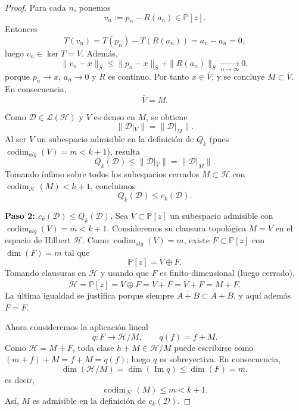 \documentclass[12pt,a4paper]{article}
\theoremstyle{definition}
\theoremstyle{remark}
\begin{document}
\begin{proof}
	Para cada $n$, ponemos
	\[
		v_n:=p_n-R(a_n)\in\mathbb P[z].
	\]
	Entonces
	\[
		T(v_n)=T(p_n)-T(R(a_n))=a_n-a_n=0,
	\]
	luego $v_n\in\ker T=V$. Además,
	\[
		\|v_n-x\|_S\le \|p_n-x\|_S+\|R(a_n)\|_S\xrightarrow[n\to\infty]{}0,
	\]
	porque $p_n\to x$, $a_n\to0$ y $R$ es continuo. Por tanto $x\in\overline V$, y se concluye $M\subset\overline V$. En consecuencia,
	\[
		\overline V=M.
	\]

	Como $\mathcal D\in\mathcal L(\mathcal H)$ y $V$ es denso en $M$, se obtiene
	\[
		\|\mathcal D|_V\|=\|\mathcal D|_M\|.
	\]
	Al ser $V$ un subespacio admisible en la definición de $Q_k$ (pues $\operatorname{codim}_{alg}(V)=m<k+1$), resulta
	\[
		Q_k(\mathcal D)\le \|\mathcal D|_V\|=\|\mathcal D|_M\|.
	\]
	Tomando ínfimo sobre todos los subespacios cerrados $M\subset\mathcal H$ con $\operatorname{codim}_{\mathcal H}(M)<k+1$, concluimos
	\[
		Q_k(\mathcal D)\le c_k(\mathcal D).
	\]

	\textbf{Paso 2: $c_k(\mathcal{D}) \le Q_k(\mathcal{D})$.}
	Sea $V \subset \mathbb{P}[z]$ un subespacio admisible con $\operatorname{codim}_{alg}(V) = m < k+1$. Consideremos su clausura topológica $M = \overline{V}$ en el espacio de Hilbert $\mathcal{H}$.
	Como $\operatorname{codim}_{alg}(V)=m$, existe $F\subset\mathbb{P}[z]$ con $\dim(F)=m$ tal que
	\[
		\mathbb{P}[z]=V\oplus F.
	\]
	Tomando clausuras en $\mathcal{H}$ y usando que $F$ es finito-dimensional (luego cerrado),
	\[
		\mathcal{H}=\overline{\mathbb{P}[z]}=\overline{V\oplus F}=\overline{V+F}=\overline V+F=M+F.
	\]
	La última igualdad se justifica porque siempre $\overline{A+B}\subset \overline A+\overline B$, y aquí además $\overline F=F$.

	Ahora consideremos la aplicación lineal
	\[
		q:F\to \mathcal H/M,\qquad q(f)=f+M.
	\]
	Como $\mathcal H=M+F$, toda clase $h+M\in\mathcal H/M$ puede escribirse como $(m+f)+M=f+M=q(f)$; luego $q$ es sobreyectiva. En consecuencia,
	\[
		\dim(\mathcal{H}/M)=\dim(\operatorname{Im}q)\le \dim(F)=m,
	\]
	es decir,
	\[
		\operatorname{codim}_{\mathcal{H}}(M)\le m<k+1.
	\]
	Así, $M$ es admisible en la definición de $c_k(\mathcal{D})$.


\end{proof}
\end{document}
